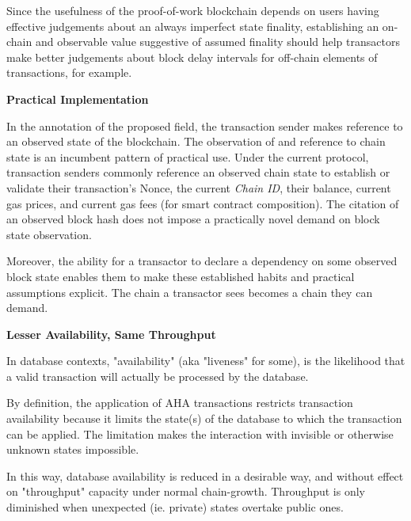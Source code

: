 \documentclass[11pt]{article}
\theoremstyle{plain}
\begin{document}
{Since the usefulness of the proof-of-work blockchain depends on users
having effective judgements about an always imperfect state finality, establishing an
on-chain and observable value suggestive of assumed finality should help
transactors make better judgements about block delay intervals for off-chain elements of transactions, for example.

\textbf{Practical Implementation}

In the annotation of the proposed field, the transaction sender makes reference to an observed state of the blockchain.
The observation of and reference to chain state is an incumbent pattern of practical use.
Under the current protocol, transaction senders commonly reference an observed chain state to
establish or validate their transaction's Nonce, the current \textit{Chain ID}, their balance, current gas prices,
and current gas fees (for smart contract composition).
The citation of an observed block hash does not impose a practically novel demand on block state observation.

Moreover, the ability for a transactor to declare a dependency on some observed block state
enables them to make these established habits and practical assumptions explicit.
The chain a transactor sees becomes a chain they can demand.

\textbf{Lesser Availability, Same Throughput}

In database contexts, "availability" (aka "liveness" for some),
is the likelihood that a valid transaction will actually be processed by the database.

By definition, the application of AHA transactions restricts transaction availability
because it limits the state(s) of the database to which the transaction can be applied.
The limitation makes the interaction with invisible or otherwise unknown states impossible.

In this way, database availability is reduced in a desirable way, and without effect
on "throughput" capacity under normal chain-growth.
Throughput is only diminished when unexpected (ie. private) states overtake public ones.



}
\end{document}
